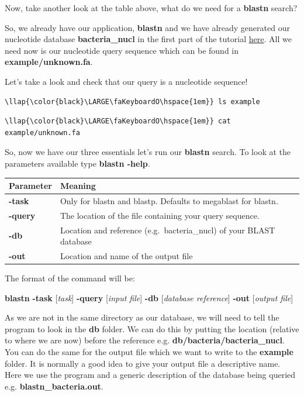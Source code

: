 \documentclass[11pt]{article}
\begin{document}
Now, take another look at the table above, what do we need for a
\textbf{blastn} search?

So, we already have our application, \textbf{blastn} and we have already
generated our nucleotide database \textbf{bacteria\_nucl} in the first
part of the tutorial \href{format_database.ipynb}{here}. All we need now
is our nucleotide query sequence which can be found in
\textbf{example/unknown.fa}.

Let's take a look and check that our query is a nucleotide sequence!

\begin{terminalinput}
\begin{Verbatim}[commandchars=\\\{\}]
\llap{\color{black}\LARGE\faKeyboardO\hspace{1em}} ls example
\end{Verbatim}
\end{terminalinput}

\begin{terminalinput}
\begin{Verbatim}[commandchars=\\\{\}]
\llap{\color{black}\LARGE\faKeyboardO\hspace{1em}} cat example/unknown.fa
\end{Verbatim}
\end{terminalinput}

    So, now we have our three essentials let's run our \textbf{blastn}
search. To look at the parameters available type \textbf{blastn -help}.

\begin{longtable}[]{@{}ll@{}}
\hline
\textbf{Parameter} & \textbf{Meaning}\tabularnewline
\hline
\endhead
\textbf{-task} & Only for blastn and blastp. Defaults to megablast for
blastn.\tabularnewline
\textbf{-query} & The location of the file containing your query
sequence.\tabularnewline
\textbf{-db} & Location and reference (e.g.~bacteria\_nucl) of your
BLAST database\tabularnewline
\textbf{-out} & Location and name of the output file\tabularnewline
\hline
\end{longtable}

The format of the command will be:

\textbf{blastn} \textbf{-task} {[}\textit{task}{]} \textbf{-query}
{[}\textit{input file}{]} \textbf{-db} {[}\textit{database reference}{]}
\textbf{-out} {[}\textit{output file}{]}

As we are not in the same directory as our database, we will need to
tell the program to look in the \textbf{db} folder. We can do this by
putting the location (relative to where we are now) before the reference
e.g. \textbf{db/bacteria/bacteria\_nucl}. You can do the same for the
output file which we want to write to the \textbf{example} folder. It is
normally a good idea to give your output file a descriptive name. Here
we use the program and a generic description of the database being
queried e.g. \textbf{blastn\_bacteria.out}.
\end{document}
